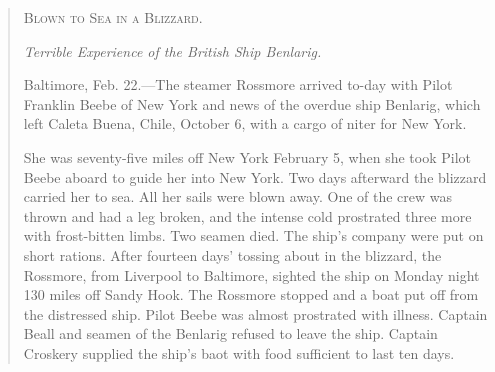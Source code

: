 \begin{quotation}
\textsc{Blown to Sea in a Blizzard.}

\emph{Terrible Experience of the British Ship Benlarig.}

Baltimore, Feb. 22.---The steamer Rossmore arrived to-day with Pilot Franklin Beebe of New York and news of the overdue ship Benlarig, which left Caleta Buena, Chile, October 6, with a cargo of niter for New York.

She was seventy-five miles off New York February 5, when she took Pilot Beebe aboard to guide her into New York. Two days afterward the blizzard carried her to sea. All her sails were blown away. One of the crew was thrown and had a leg broken, and the intense cold prostrated three more with frost-bitten limbs. Two seamen died. The ship's company were put on short rations. After fourteen days' tossing about in the blizzard, the Rossmore, from Liverpool to Baltimore, sighted the ship on Monday night 130 miles off Sandy Hook. The Rossmore stopped and a boat put off from the distressed ship. Pilot Beebe was almost prostrated with illness. Captain Beall and seamen of the Benlarig refused to leave the ship. Captain Croskery supplied the ship's baot with food sufficient to last ten days. 
\end{quotation}


